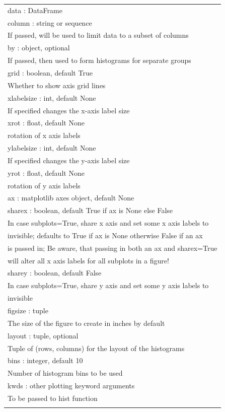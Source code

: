 \documentclass[11pt]{article}
\begin{document}
\begin{enumerate}
\begin{enumerate}
\begin{enumerate}
\begin{center}
\begin{tabular}{l}
data : DataFrame\\
column : string or sequence\\
If passed, will be used to limit data to a subset of columns\\
by : object, optional\\
If passed, then used to form histograms for separate groups\\
grid : boolean, default True\\
Whether to show axis grid lines\\
xlabelsize : int, default None\\
If specified changes the x-axis label size\\
xrot : float, default None\\
rotation of x axis labels\\
ylabelsize : int, default None\\
If specified changes the y-axis label size\\
yrot : float, default None\\
rotation of y axis labels\\
ax : matplotlib axes object, default None\\
sharex : boolean, default True if ax is None else False\\
In case subplots=True, share x axis and set some x axis labels to\\
invisible; defaults to True if ax is None otherwise False if an ax\\
is passed in; Be aware, that passing in both an ax and sharex=True\\
will alter all x axis labels for all subplots in a figure!\\
sharey : boolean, default False\\
In case subplots=True, share y axis and set some y axis labels to\\
invisible\\
figsize : tuple\\
The size of the figure to create in inches by default\\
layout : tuple, optional\\
Tuple of (rows, columns) for the layout of the histograms\\
bins : integer, default 10\\
Number of histogram bins to be used\\
kwds : other plotting keyword arguments\\
To be passed to hist function\\
\\

\end{tabular}
\end{center}
\end{enumerate}
\end{enumerate}
\end{enumerate}
\end{document}
